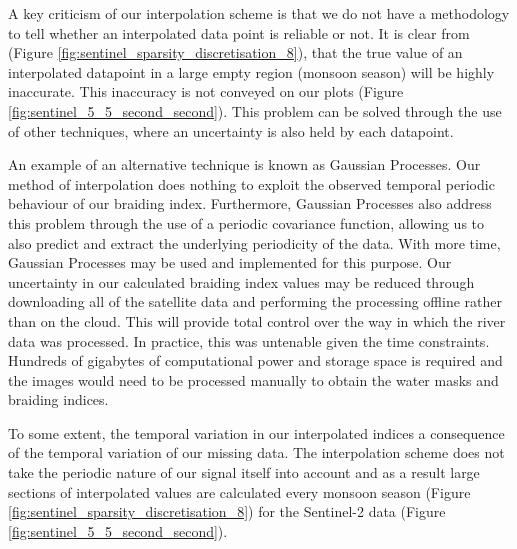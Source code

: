 \documentclass[12pt]{article}
\begin{document}
A key criticism of our interpolation scheme is that we do not have a methodology to tell whether an interpolated data point is reliable or not. It is clear from (Figure \ref{fig:sentinel_sparsity_discretisation_8}), that the true value of an interpolated datapoint in a large empty region (monsoon season) will be highly inaccurate. This inaccuracy is not conveyed on our plots (Figure \ref{fig:sentinel_5_5_second_second}). This problem can be solved through the use of other techniques, where an uncertainty is also held by each datapoint.

An example of an alternative technique is known as Gaussian Processes\cite{rasmussen}. Our method of interpolation does nothing to exploit the observed temporal periodic behaviour of our braiding index. Furthermore, Gaussian Processes also address this problem through the use of a periodic covariance function, allowing us to also predict and extract the underlying periodicity of the data. With more time, Gaussian Processes may be used and implemented for this purpose. Our uncertainty in our calculated braiding index values may be reduced through downloading all of the satellite data and performing the processing offline rather than on the cloud. This will provide total control over the way in which the river data was processed. In practice, this was untenable given the time constraints. Hundreds of gigabytes of computational power and storage space is required and the images would need to be processed manually to obtain the water masks and braiding indices.

To some extent, the temporal variation in our interpolated indices a consequence of the temporal variation of our missing data. The interpolation scheme does not take the periodic nature of our signal itself into account and as a result large sections of interpolated values are calculated every monsoon season (Figure \ref{fig:sentinel_sparsity_discretisation_8}) for the Sentinel-2 data (Figure \ref{fig:sentinel_5_5_second_second}).

    

\end{document}
